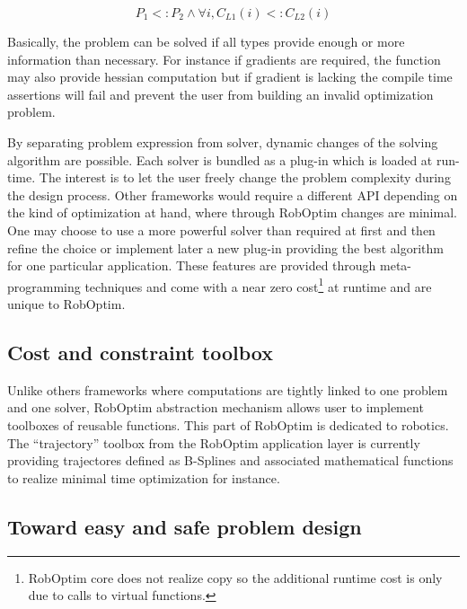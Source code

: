 \documentclass[conference,final,a4paper,twocolumn,9pt]{IEEEtran}
\begin{document}
\begin{equation}
  P_1 <: P_2 \wedge \forall i, C_{L1}(i) <: C_{L2}(i)
\end{equation}


Basically, the problem can be solved if all types provide enough or
more information than necessary. For instance if gradients are
required, the function may also provide hessian computation but if
gradient is lacking the compile time assertions will fail and prevent
the user from building an invalid optimization problem.

By separating problem expression from solver, dynamic changes of the
solving algorithm are possible. Each solver is bundled as a plug-in
which is loaded at run-time. The interest is to let the user freely
change the problem complexity during the design process. Other
frameworks would require a different API depending on the kind of
optimization at hand, where through RobOptim changes are minimal. One
may choose to use a more powerful solver than required at first and
then refine the choice or implement later a new plug-in providing the
best algorithm for one particular application. These features are
provided through meta-programming techniques and come with a near zero
cost\footnote{RobOptim core does not realize copy so the additional
  runtime cost is only due to calls to virtual functions.} at runtime
and are unique to RobOptim.

\subsection{Cost and constraint toolbox}


Unlike others frameworks where computations are tightly linked to one
problem and one solver, RobOptim abstraction mechanism allows user to
implement toolboxes of reusable functions. This part of RobOptim is
dedicated to robotics. The ``trajectory'' toolbox from the RobOptim
application layer is currently providing trajectores defined as
B-Splines and associated mathematical functions to realize minimal
time optimization for instance.


\subsection{Toward easy and safe problem design}
\end{document}
